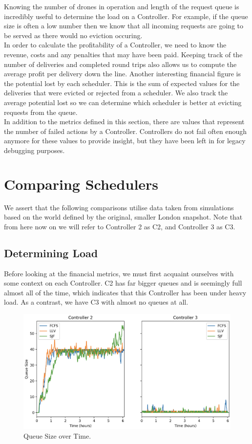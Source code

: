 \documentclass[a4paper,11pt,titlepage]{report}
\begin{document}
Knowing the number of drones in operation and length of the request queue is incredibly useful to determine the load on a Controller. For example, if the queue size is often a low number then we know that all incoming requests are going to be served as there would no eviction occuring.\\

In order to calculate the profitability of a Controller, we need to know the revenue, costs and any penalties that may have been paid. Keeping track of the number of deliveries and completed round trips also allows us to compute the average profit per delivery down the line. Another interesting financial figure is the potential lost by each scheduler. This is the sum of expected values for the deliveries that were evicted or rejected from a scheduler. We also track the average potential lost so we can determine which scheduler is better at evicting requests from the queue.\\

In addition to the metrics defined in this section, there are values that represent the number of failed actions by a Controller. Controllers do not fail often enough anymore for these values to provide insight, but they have been left in for legacy debugging purposes.

\section{Comparing Schedulers}
We assert that the following comparisons utilise data taken from simulations based on the world defined by the original, smaller London snapshot. Note that from here now on we will refer to Controller 2 as C2, and Controller 3 as C3.

\subsection{Determining Load}
Before looking at the financial metrics, we must first acquaint ourselves with some context on each Controller. C2 has far bigger queues and is seemingly full almost all of the time, which indicates that this Controller has been under heavy load. As a contrast, we have C3 with almost no queues at all.

\begin{figure}[!hbpt]
  \center
  \includegraphics[width=\linewidth]{img/small/drones.png}
  \caption{Queue Size over Time.}
  \label{fig:small_drones}
\end{figure}
\end{document}
